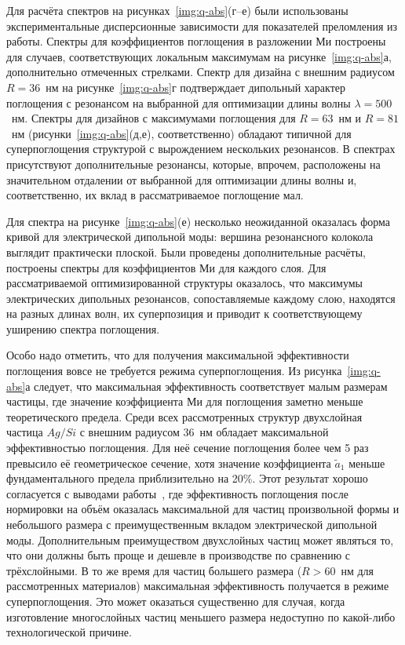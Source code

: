 Для расчёта спектров на рисунках~\ref{img:q-abs}(г--е) были
использованы экспериментальные дисперсионные зависимости для
показателей преломления из работы\cite{palik-1997}. Спектры для
коэффициентов поглощения в разложении Ми построены для случаев,
соответствующих локальным максимумам на рисунке~\ref{img:q-abs}а,
дополнительно отмеченных стрелками.  Спектр для дизайна с внешним
радиусом $R=36$~нм на рисунке~\ref{img:q-abs}г подтверждает
дипольный характер поглощения с резонансом на выбранной для
оптимизации длины волны $\lambda=500$~нм.  Спектры для дизайнов с
максимумами поглощения для $R=63$~нм и $R=81$~нм
(рисунки~\ref{img:q-abs}(д,е), соответственно)
обладают типичной для суперпоглощения структурой с вырождением
нескольких резонансов. В спектрах присутствуют дополнительные
резонансы, которые, впрочем, расположены на значительном отдалении от
выбранной для оптимизации длины волны и, соответственно, их вклад в
рассматриваемое поглощение мал.

Для спектра на рисунке~\ref{img:q-abs}(е) несколько неожиданной
оказалась форма кривой для электрической дипольной моды: вершина
резонансного колокола выглядит практически плоской.  Были проведены
дополнительные расчёты, построены спектры для коэффициентов Ми для
каждого слоя. Для рассматриваемой оптимизированной структуры
оказалось, что максимумы электрических дипольных резонансов,
сопоставляемые каждому слою, находятся на разных длинах волн, их
суперпозиция и приводит к соответствующему уширению спектра
поглощения.

Особо надо отметить, что для получения максимальной эффективности
поглощения вовсе не требуется режима суперпоглощения.  Из
рисунка~\ref{img:q-abs}а следует, что максимальная эффективность
соответствует малым размерам частицы, где значение коэффициента Ми для
поглощения заметно меньше теоретического предела.  Среди всех
рассмотренных структур двухслойная частица $Ag/Si$ с внешним радиусом
36~нм обладает максимальной эффективностью поглощения.  Для неё
сечение поглощения более чем 5 раз превысило её геометрическое
сечение, хотя значение коэффициента $\tilde{a}_1$ меньше
фундаментального предела приблизительно на 20\%.  Этот результат
хорошо согласуется с выводами работы~\cite{Miller-2014}, где
эффективность поглощения после нормировки на объём оказалась
максимальной для частиц произвольной формы и небольшого размера с
преимущественным вкладом электрической дипольной моды.  Дополнительным
преимуществом двухслойных частиц может являться то, что они должны
быть проще и дешевле в производстве по сравнению с трёхслойными.  В то
же время для частиц большего размера ($R>60$~нм для рассмотренных
материалов) максимальная эффективность получается в режиме
суперпоглощения.  Это может оказаться существенно для случая, когда
изготовление многослойных частиц меньшего размера недоступно по
какой-либо технологической причине.

